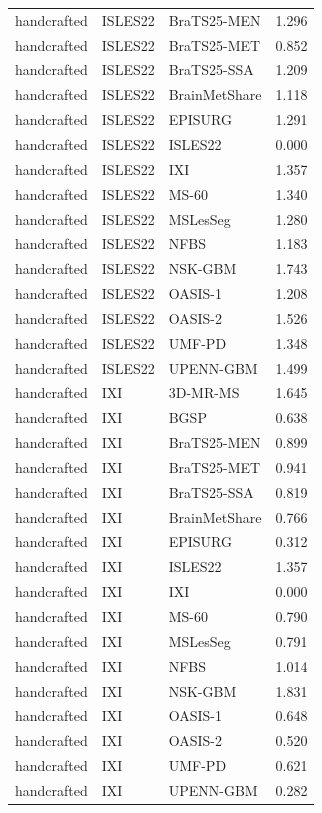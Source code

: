 \begin{tabular}{lllr}
handcrafted & ISLES22 & BraTS25-MEN & 1.296 \\
handcrafted & ISLES22 & BraTS25-MET & 0.852 \\
handcrafted & ISLES22 & BraTS25-SSA & 1.209 \\
handcrafted & ISLES22 & BrainMetShare & 1.118 \\
handcrafted & ISLES22 & EPISURG & 1.291 \\
handcrafted & ISLES22 & ISLES22 & 0.000 \\
handcrafted & ISLES22 & IXI & 1.357 \\
handcrafted & ISLES22 & MS-60 & 1.340 \\
handcrafted & ISLES22 & MSLesSeg & 1.280 \\
handcrafted & ISLES22 & NFBS & 1.183 \\
handcrafted & ISLES22 & NSK-GBM & 1.743 \\
handcrafted & ISLES22 & OASIS-1 & 1.208 \\
handcrafted & ISLES22 & OASIS-2 & 1.526 \\
handcrafted & ISLES22 & UMF-PD & 1.348 \\
handcrafted & ISLES22 & UPENN-GBM & 1.499 \\
handcrafted & IXI & 3D-MR-MS & 1.645 \\
handcrafted & IXI & BGSP & 0.638 \\
handcrafted & IXI & BraTS25-MEN & 0.899 \\
handcrafted & IXI & BraTS25-MET & 0.941 \\
handcrafted & IXI & BraTS25-SSA & 0.819 \\
handcrafted & IXI & BrainMetShare & 0.766 \\
handcrafted & IXI & EPISURG & 0.312 \\
handcrafted & IXI & ISLES22 & 1.357 \\
handcrafted & IXI & IXI & 0.000 \\
handcrafted & IXI & MS-60 & 0.790 \\
handcrafted & IXI & MSLesSeg & 0.791 \\
handcrafted & IXI & NFBS & 1.014 \\
handcrafted & IXI & NSK-GBM & 1.831 \\
handcrafted & IXI & OASIS-1 & 0.648 \\
handcrafted & IXI & OASIS-2 & 0.520 \\
handcrafted & IXI & UMF-PD & 0.621 \\
handcrafted & IXI & UPENN-GBM & 0.282 \\

\end{tabular}
